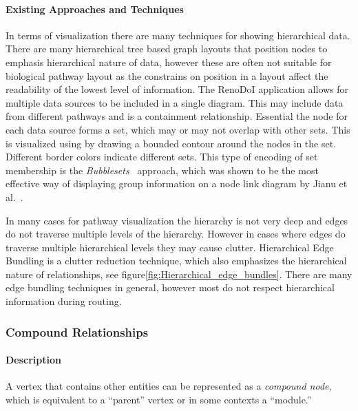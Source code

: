 \paragraph*{Existing Approaches and Techniques}
In terms of visualization there are many techniques for showing hierarchical data.
There are many hierarchical tree based graph layouts that position nodes to emphasis hierarchical nature of data, however these are often not suitable for biological pathway layout as the constrains on position in a layout affect the readability of the lowest level of information.
The RenoDoI application allows for multiple data sources to be included in a single diagram.
This may include data from different pathways and is a containment relationship. Essential the node for each data source forms a set, which may or may not overlap with other sets.
This is visualized using by drawing a bounded contour around the nodes in the set. Different border colors indicate different sets.
This type of encoding of  set membership is the \textit{Bubblesets}~\cite{Collins2009} approach, which was shown to be the most effective way of displaying group information on a node link diagram by Jianu et al.~\cite{Jianu2014}.

In many cases for pathway visualization the hierarchy is not very deep and edges do not traverse multiple levels of the hierarchy.
However in cases where edges do traverse  multiple hierarchical levels they may cause clutter.
Hierarchical Edge Bundling \cite{Holten2006} is a clutter reduction technique, which also emphasizes the hierarchical nature of relationships, see figure\ref{fig:Hierarchical_edge_bundles}. There are many edge bundling techniques in general, however most do not respect hierarchical information during routing.

\subsubsection*{Compound Relationships}

\paragraph*{Description}

A vertex that contains other entities can be represented as a \textit{compound node}, which is equivalent to a ``parent'' vertex or in some contexts a ``module.''

